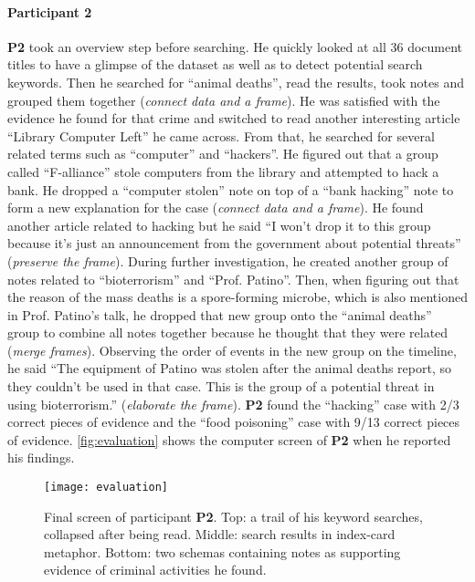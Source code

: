 \paragraph{Participant 2}
\textbf{P2} took an overview step before searching. He quickly looked at all 36 document titles to have a glimpse of the dataset as well as to detect potential search keywords. Then he searched for ``animal deaths'', read the results, took notes and grouped them together (\emph{connect data and a frame}). He was satisfied with the evidence he found for that crime and switched to read another interesting article ``Library Computer Left'' he came across. From that, he searched for several related terms such as ``computer'' and ``hackers''. He figured out that a group called ``F-alliance'' stole computers from the library and attempted to hack a bank. He dropped a ``computer stolen'' note on top of a ``bank hacking'' note to form a new explanation for the case (\emph{connect data and a frame}). He found another article related to hacking but he said ``I won't drop it to this group because it's just an announcement from the government about potential threats'' (\emph{preserve the frame}). During further investigation, he created another group of notes related to ``bioterrorism'' and ``Prof. Patino''. Then, when figuring out that the reason of the mass deaths is a spore-forming microbe, which is also mentioned in Prof. Patino's talk, he dropped that new group onto the ``animal deaths'' group to combine all notes together because he thought that they were related (\emph{merge frames}). Observing the order of events in the new group on the timeline, he said ``The equipment of Patino was stolen after the animal deaths report, so they couldn't be used in that case. This is the group of a potential threat in using bioterrorism.'' (\emph{elaborate the frame}). \textbf{P2} found the ``hacking'' case with 2/3 correct pieces of evidence and the ``food poisoning'' case with 9/13 correct pieces of evidence. \autoref{fig:evaluation} shows the computer screen of \textbf{P2} when he reported his findings.

\begin{figure*}[!htb]
	\centering
	\texttt{[image: evaluation]}
	\caption[Final screen of participant \textbf{P2}]{Final screen of participant \textbf{P2}. Top: a trail of his keyword searches, collapsed after being read. Middle: search results in index-card metaphor. Bottom: two schemas containing notes as supporting evidence of criminal activities he found.}
	\label{fig:evaluation}
\end{figure*}

